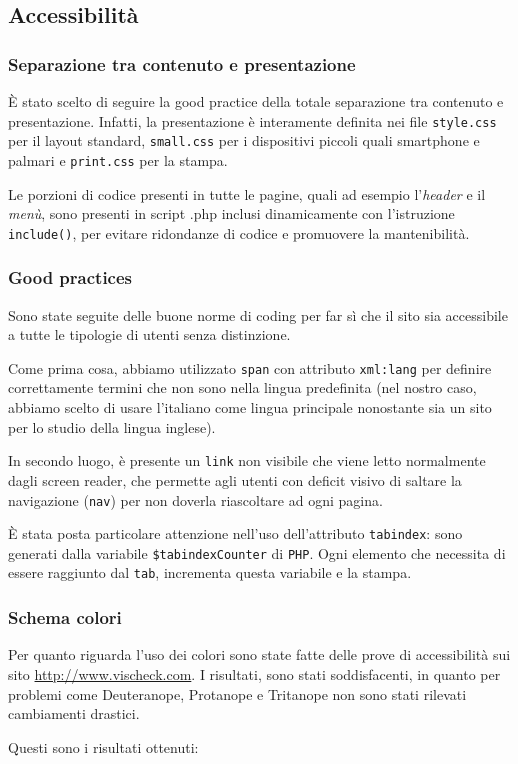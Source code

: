 \documentclass[12pt, a4paper]{article}
\newcommand*{\egrave}{\MakeUppercase{è} }
\begin{document}
\subsection{Accessibilità}

\subsubsection{Separazione tra contenuto e presentazione}
\egrave stato scelto di seguire la good practice della totale separazione tra 
contenuto e presentazione. Infatti, la presentazione è interamente 
definita nei file \texttt{style.css} per il layout standard, \texttt{small.css}
per i dispositivi piccoli quali smartphone e palmari e \texttt{print.css} per la stampa.\par
Le porzioni di codice presenti in tutte le pagine, quali ad esempio l’\emph{header} e il \emph{menù}, sono presenti in script .php inclusi dinamicamente con l'istruzione \texttt{\mbox{include()}}, per evitare ridondanze di codice e promuovere la mantenibilità.

\subsubsection{Good practices}
Sono state seguite delle buone norme di coding per far sì che il sito sia accessibile a 
tutte le tipologie di utenti senza distinzione. \par
Come prima cosa, abbiamo utilizzato \texttt{span} con attributo \texttt{xml:lang} per definire correttamente termini che non sono nella lingua predefinita (nel nostro caso, abbiamo scelto di usare l'italiano come lingua principale nonostante sia un sito per 
lo studio della lingua inglese). \par
In secondo luogo, è presente un \texttt{link} non visibile che viene letto 
normalmente dagli screen reader, che permette agli utenti con deficit visivo di
saltare la navigazione (\texttt{nav}) per non doverla riascoltare ad ogni pagina.\par
\egrave stata posta particolare attenzione nell'uso dell'attributo \texttt{tabindex}: sono generati dalla variabile \texttt{\$tabindexCounter} di \texttt{PHP}. Ogni elemento che 
necessita di essere raggiunto dal \texttt{tab}, incrementa questa variabile e la stampa.

\subsubsection{Schema colori}
Per quanto riguarda l’uso dei colori sono state fatte delle prove di accessibilità sui sito
\mbox{\url{http://www.vischeck.com}}. I risultati, sono stati soddisfacenti, in quanto per problemi come Deuteranope, Protanope e Tritanope non sono stati rilevati cambiamenti drastici.\par
Questi sono i risultati ottenuti: \par
\end{document}
